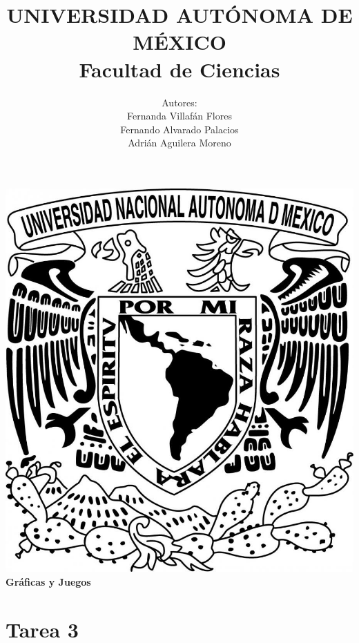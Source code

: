 \documentclass{article}
\begin{document}
  \title{UNIVERSIDAD AUT\'ONOMA DE M\'EXICO\\ Facultad de Ciencias}
  \author{Autores:
    \\ Fernanda Villaf\'an Flores
    \\ Fernando Alvarado Palacios
    \\ Adri\'an Aguilera Moreno}
  \date{}
  \maketitle
  \begin{center}
    \includegraphics[scale=0.20]{../Imagen/Portada.jpg}\\[0.4cm]
    \Large
    \bf{Gr\'aficas y Juegos}
    \normalsize
  \end{center}
  \newpage
  \section*{\LARGE{Tarea 3}}
\end{document}

